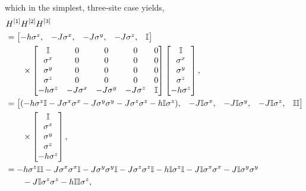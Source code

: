  which in the simplest, three-site case yields,
 \begin{align}
 	&H^{[1]}H^{[2]}H^{[3]} \notag \\
 	&= \begin{bmatrix} -h\sigma^{z}, & -J\sigma^{x}, & -J\sigma^{y}, & -J\sigma^{z}, & \mathbb{I} \end{bmatrix} \notag \\
 	&\qquad \times
 							\begin{bmatrix} \mathbb{I} & 0 & 0 & 0 & 0 \\
 										   \sigma^{x} & 0 & 0 & 0 & 0 \\
 										   \sigma^{y} & 0 & 0 & 0 & 0 \\
 										   \sigma^{z} & 0 & 0 & 0 & 0 \\
 										    -h\sigma^{z} & -J\sigma^{x} & -J\sigma^{y} & -J\sigma^{z} & \mathbb{I}
 							\end{bmatrix}
 							\begin{bmatrix} \mathbb{I} \\ \sigma^{x} \\ \sigma^{y} \\ \sigma^{z} \\ -h\sigma^{z} \end{bmatrix}, \notag \\
 	&= \begin{bmatrix} (-h\sigma^{z}\mathbb{I} - J\sigma^{x}\sigma^{x} - J\sigma^{y}\sigma^{y} - J\sigma^{z}\sigma^{z} - h\mathbb{I}\sigma^{z}), & -J\mathbb{I}\sigma^{x}, & -J\mathbb{I}\sigma^{y}, & -J\mathbb{I}\sigma^{z}, & \mathbb{I}\mathbb{I} \end{bmatrix} \notag \\
 	&\qquad \times \begin{bmatrix} \mathbb{I} \\ \sigma^{x} \\ \sigma^{y} \\ \sigma^{z} \\ -h\sigma^{z} \end{bmatrix}, \notag \\
 	&= -h\sigma^{z}\mathbb{I}\mathbb{I} - J\sigma^{x}\sigma^{x}\mathbb{I} - J\sigma^{y}\sigma^{y}\mathbb{I} - J\sigma^{z}\sigma^{z}\mathbb{I} - h\mathbb{I}\sigma^{z}\mathbb{I} - J \mathbb{I}\sigma^{x}\sigma^{x} -  J \mathbb{I}\sigma^{y}\sigma^{y} \notag \\
 	&\qquad - J \mathbb{I}\sigma^{z}\sigma^{z} - h \mathbb{I}\mathbb{I}\sigma^{z},
 	\label{eq:mpo1-5}
 \end{align}

